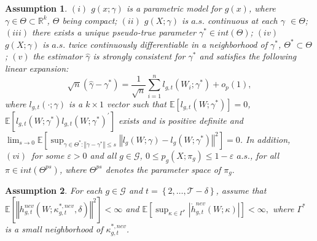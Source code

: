 \documentclass[11pt]{article}%
\theoremstyle{plain}
\newtheorem{assumption}{Assumption}
\numberwithin{sassumption}{section}
\numberwithin{equation}{section}
\begin{document}
\begin{assumption}
\label{ass:parametric} $\left(  i\right)  $ $g\left(  x;\gamma\right)  $ is a
parametric model for $g\left(  x\right)  $, where $\gamma\in\Theta
\subset\mathbb{R}^{k}$, $\Theta$ being compact; $\left(  ii\right)  $
$g\left(  X;\gamma\right)  $ is $a.s.$ continuous at each $\gamma$ $\in\Theta
$; $\left(  iii\right)  $ there exists a unique pseudo-true parameter
$\gamma^{\ast}\in int\left(  \Theta\right)  $; $\left(  iv\right)  $ $g\left(
X;\gamma\right)  $ is $a.s.$ twice continuously differentiable in a
neighborhood of $\gamma^{\ast}$, $\Theta^{\ast}\subset\Theta$; $\left(
v\right)  $ the estimator $\widehat{\gamma}$ is strongly consistent for
$\gamma^{\ast}$ and satisfies the following linear expansion:%
\[
\sqrt{n}\left(  \widehat{\gamma}-\gamma^{\ast}\right)  =\frac{1}{\sqrt{n}}%
\sum_{i=1}^{n}l_{g,t}\left(  W_{i};\gamma^{\ast}\right)  +o_{p}\left(
1\right)  ,
\]
where $l_{g,t}\left(  \cdot;\gamma\right)  $ is a $k\times1$ vector such that
$\mathbb{E}\left[  l_{g,t}\left(  W;\gamma^{\ast}\right)  \right]  =0$,
$\mathbb{E}\left[  l_{g,t}\left(  W;\gamma^{\ast}\right)  l_{g,t}\left(
W;\gamma^{\ast}\right)  ^{\prime}\right]  $ exists and is positive definite
and $\lim_{s\rightarrow0}\mathbb{E}\left[  \sup_{\gamma\in\Theta^{\ast
}:\left\Vert \gamma-\gamma^{\ast}\right\Vert \leq s}\left\Vert l_{g}\left(
W;\gamma\right)  -l_{g}\left(  W;\gamma^{\ast}\right)  \right\Vert
^{2}\right]  =0$. In addition, $\left(  vi\right)  $~for some $\varepsilon>0$
and all $g\in\mathcal{G}$, $0\leq p_{g}\left(  X;\pi_{g}\right)
\leq1-\varepsilon$ $a.s.$, for all $\pi\in int\left(  \Theta^{ps}\right)  $,
where $\Theta^{ps}$ denotes the parameter space of $\pi_{g}.$
\end{assumption}

\begin{assumption}
\label{ass:integrabilitity} For each $g\in\mathcal{G}$ and $t=\left\{
2,\dots,\mathcal{T-\delta}\right\}  $, assume that $\mathbb{E}\left[
\left\Vert h_{g,t}^{nev}\left(  W;\kappa_{g,t}^{\ast,nev},\delta\right)
\right\Vert ^{2}\right]  <\infty$ and $\mathbb{E}\left[  \sup_{\kappa\in
\Gamma^{\ast}}\left\vert \dot{h}_{g,t}^{nev}\left(  W;\kappa\right)
\right\vert \right]  <\infty,$ where $\Gamma^{\ast}$ is a small neighborhood
of $\kappa_{g,t}^{\ast,nev}$.
\end{assumption}
\end{document}

